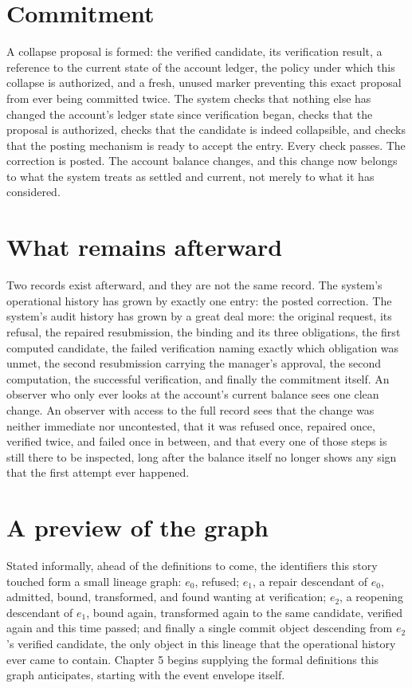 \documentclass[11pt,openany]{book}
\begin{document}
\section*{Commitment}

A collapse proposal is formed: the verified candidate, its verification
result, a reference to the current state of the account ledger, the policy
under which this collapse is authorized, and a fresh, unused marker preventing
this exact proposal from ever being committed twice. The system checks that
nothing else has changed the account's ledger state since verification began,
checks that the proposal is authorized, checks that the candidate is indeed
collapsible, and checks that the posting mechanism is ready to accept the
entry. Every check passes. The correction is posted. The account balance
changes, and this change now belongs to what the system treats as settled and
current, not merely to what it has considered.

\section*{What remains afterward}

Two records exist afterward, and they are not the same record. The system's
operational history has grown by exactly one entry: the posted correction. The
system's audit history has grown by a great deal more: the original request,
its refusal, the repaired resubmission, the binding and its three obligations,
the first computed candidate, the failed verification naming exactly which
obligation was unmet, the second resubmission carrying the manager's approval,
the second computation, the successful verification, and finally the
commitment itself. An observer who only ever looks at the account's current
balance sees one clean change. An observer with access to the full record sees
that the change was neither immediate nor uncontested, that it was refused
once, repaired once, verified twice, and failed once in between, and that every
one of those steps is still there to be inspected, long after the balance
itself no longer shows any sign that the first attempt ever happened.

\section*{A preview of the graph}

Stated informally, ahead of the definitions to come, the identifiers this
story touched form a small lineage graph: \(e_0\), refused; \(e_1\), a repair
descendant of \(e_0\), admitted, bound, transformed, and found wanting at
verification; \(e_2\), a reopening descendant of \(e_1\), bound again,
transformed again to the same candidate, verified again and this time passed;
and finally a single commit object descending from \(e_2\)'s verified
candidate, the only object in this lineage that the operational history ever
came to contain. Chapter 5 begins supplying the formal definitions this graph
anticipates, starting with the event envelope itself.
\end{document}
